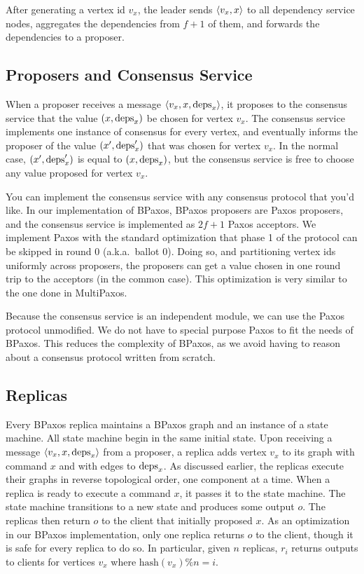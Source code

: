 After generating a vertex id $v_x$, the leader sends $\langle v_x, x \rangle$ to all
dependency service nodes, aggregates the dependencies from $f+1$ of them, and
forwards the dependencies to a proposer.

\subsection{Proposers and Consensus Service}
When a proposer receives a message $\langle v_x, x, \text{deps}_x \rangle$, it proposes to
the consensus service that the value $(x, \text{deps}_x)$ be chosen for vertex
$v_x$. The consensus service implements one instance of consensus for every
vertex, and eventually informs the proposer of the value $(x', \text{deps}_x')$
that was chosen for vertex $v_x$. In the normal case, $(x', \text{deps}_x')$ is
equal to $(x, \text{deps}_x)$, but the consensus service is free to choose any
value proposed for vertex $v_x$.

You can implement the consensus service with any consensus protocol that you'd
like. In our implementation of BPaxos, BPaxos proposers are Paxos proposers,
and the consensus service is implemented as $2f+1$ Paxos acceptors. We
implement Paxos with the standard optimization that phase 1 of the protocol can
be skipped in round $0$ (a.k.a.\ ballot $0$). Doing so, and partitioning vertex
ids uniformly across proposers, the proposers can get a value chosen in one
round trip to the acceptors (in the common case). This optimization is very
similar to the one done in MultiPaxos.

Because the consensus service is an independent module, we can use the Paxos
protocol unmodified. We do not have to special purpose Paxos to fit the needs
of BPaxos. This reduces the complexity of BPaxos, as we avoid having to reason
about a consensus protocol written from scratch.

\subsection{Replicas}
Every BPaxos replica maintains a BPaxos graph and an instance of a state
machine. All state machine begin in the same initial state. Upon receiving a
message $\langle v_x, x, \text{deps}_x \rangle$ from a proposer, a replica adds vertex $v_x$
to its graph with command $x$ and with edges to $\text{deps}_x$. As discussed
earlier, the replicas execute their graphs in reverse topological order, one
component at a time. When a replica is ready to execute a command $x$, it
passes it to the state machine. The state machine transitions to a new state
and produces some output $o$. The replicas then return $o$ to the client that
initially proposed $x$. As an optimization in our BPaxos implementation, only
one replica returns $o$ to the client, though it is safe for every replica to
do so. In particular, given $n$ replicas, $r_i$ returns outputs to clients for
vertices $v_x$ where $\text{hash}(v_x) \% n = i$.

